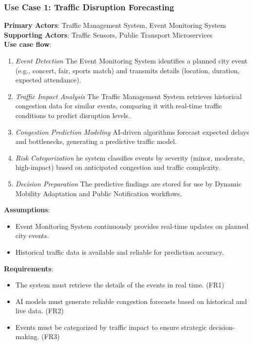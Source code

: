 \documentclass[a4paper,12pt]{article}
\begin{document}
\subsubsection*{Use Case 1: Traffic Disruption Forecasting}
\textbf{Primary Actors}: Traffic Management System, Event Monitoring System \\
\textbf{Supporting Actors}: Traffic Sensors, Public Transport Microservices \\
\textbf{Use case flow}: 
\begin{enumerate}
    \item \textit{Event Detection} The Event Monitoring System identifies a planned city event (e.g., concert, fair, sports match) and transmits details (location, duration, expected attendance).
    \item \textit{Traffic Impact Analysis} The Traffic Management System retrieves historical congestion data for similar events, comparing it with real-time traffic conditions to predict disruption levels.
    \item \textit{Congestion Prediction Modeling} AI-driven algorithms forecast expected delays and bottlenecks, generating a predictive traffic model.
    \item \textit{Risk Categorization} he system classifies events by severity (minor, moderate, high-impact) based on anticipated congestion and traffic complexity.
    \item \textit{Decision Preparation} The predictive findings are stored for use by Dynamic Mobility Adaptation and Public Notification workflows.
\end{enumerate}
\textbf{Assumptions}: 
\begin{itemize}
    \item Event Monitoring System continuously provides real-time updates on planned city events.
    \item Historical traffic data is available and reliable for prediction accuracy.
\end{itemize}
\textbf{Requirements}:
\begin{itemize}
    \item The system must retrieve the details of the events in real time. (FR1)
    \item AI models must generate reliable congestion forecasts based on historical and live data. (FR2)
    \item Events must be categorized by traffic impact to ensure strategic decision-making. (FR3)
\end{itemize}
\end{document}
